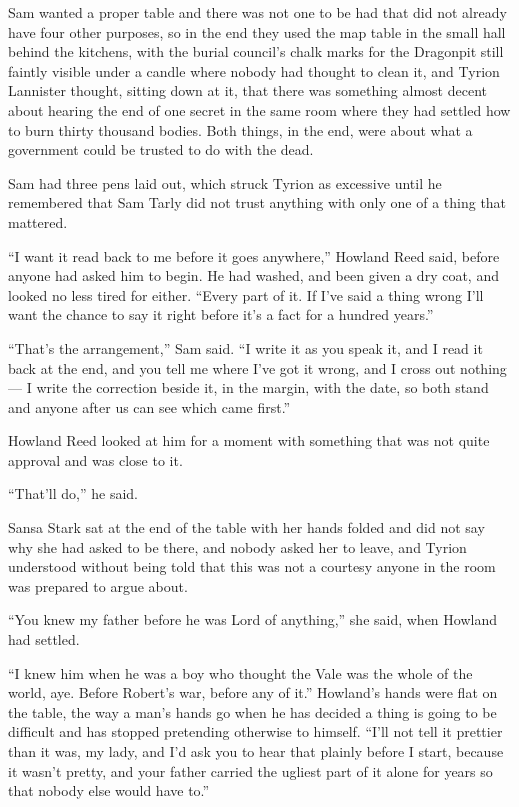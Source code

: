 Sam wanted a proper table and there was not one to be had that did not already have four other purposes, so in the end they used the map table in the small hall behind the kitchens, with the burial council’s chalk marks for the Dragonpit still faintly visible under a candle where nobody had thought to clean it, and Tyrion Lannister thought, sitting down at it, that there was something almost decent about hearing the end of one secret in the same room where they had settled how to burn thirty thousand bodies. Both things, in the end, were about what a government could be trusted to do with the dead.

Sam had three pens laid out, which struck Tyrion as excessive until he remembered that Sam Tarly did not trust anything with only one of a thing that mattered.

“I want it read back to me before it goes anywhere,” Howland Reed said, before anyone had asked him to begin. He had washed, and been given a dry coat, and looked no less tired for either. “Every part of it. If I’ve said a thing wrong I’ll want the chance to say it right before it’s a fact for a hundred years.”

“That’s the arrangement,” Sam said. “I write it as you speak it, and I read it back at the end, and you tell me where I’ve got it wrong, and I cross out nothing — I write the correction beside it, in the margin, with the date, so both stand and anyone after us can see which came first.”

Howland Reed looked at him for a moment with something that was not quite approval and was close to it.

“That’ll do,” he said.

\sceneBreak

Sansa Stark sat at the end of the table with her hands folded and did not say why she had asked to be there, and nobody asked her to leave, and Tyrion understood without being told that this was not a courtesy anyone in the room was prepared to argue about.

“You knew my father before he was Lord of anything,” she said, when Howland had settled.

“I knew him when he was a boy who thought the Vale was the whole of the world, aye. Before Robert’s war, before any of it.” Howland’s hands were flat on the table, the way a man’s hands go when he has decided a thing is going to be difficult and has stopped pretending otherwise to himself. “I’ll not tell it prettier than it was, my lady, and I’d ask you to hear that plainly before I start, because it wasn’t pretty, and your father carried the ugliest part of it alone for years so that nobody else would have to.”


